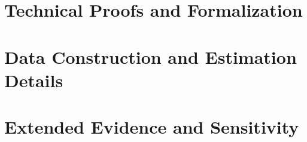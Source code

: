 \section{Technical Proofs and Formalization}


\section{Data Construction and Estimation Details}


\section{Extended Evidence and Sensitivity}

